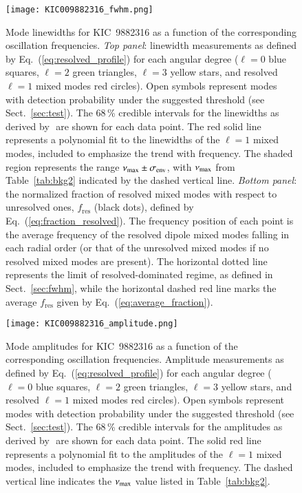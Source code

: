 \begin{figure}
   \centering
   \texttt{[image: KIC009882316\_fwhm.png]}
      \caption{Mode linewidths for KIC~9882316 as a function of the corresponding oscillation frequencies. \textit{Top panel}: linewidth measurements as defined by Eq.~(\ref{eq:resolved_profile}) for each angular degree ($\ell = 0$ blue squares, $\ell = 2$ green triangles, $\ell = 3$ yellow stars, and resolved $\ell = 1$ mixed modes red circles). Open symbols represent modes with detection probability under the suggested threshold (see Sect.~\ref{sec:test}). The 68\,\% credible intervals for the linewidths as derived by \diamonds\,\,are shown for each data point. The red solid line represents a polynomial fit to the linewidths of the $\ell = 1$ mixed modes, included to emphasize the trend with frequency. The shaded region represents the range $\nu_\mathrm{max} \pm \sigma_\mathrm{env}$, with $\nu_\mathrm{max}$ from Table~\ref{tab:bkg2} indicated by the dashed vertical line. \textit{Bottom panel}: the normalized fraction of resolved mixed modes with respect to unresolved ones, $f_\mathrm{res}$ (black dots), defined by Eq.~(\ref{eq:fraction_resolved}). The frequency position of each point is the average frequency of the resolved dipole mixed modes falling in each radial order (or that of the unresolved mixed modes if no resolved mixed modes are present). The horizontal dotted line represents the limit of resolved-dominated regime, as defined in Sect.~\ref{sec:fwhm}, while the horizontal dashed red line marks the average $f_\mathrm{res}$ given by Eq.~(\ref{eq:average_fraction}).}
    \label{fig:9882316fwhm}
\end{figure}


\begin{figure}
   \centering
   \texttt{[image: KIC009882316\_amplitude.png]}
      \caption{Mode amplitudes for KIC~9882316 as a function of the corresponding oscillation frequencies. Amplitude measurements as defined by Eq.~(\ref{eq:resolved_profile}) for each angular degree ($\ell = 0$ blue squares, $\ell = 2$ green triangles, $\ell = 3$ yellow stars, and resolved $\ell = 1$ mixed modes red circles). Open symbols represent modes with detection probability under the suggested threshold (see Sect.~\ref{sec:test}). The 68\,\% credible intervals for the amplitudes as derived by \diamonds\,\,are shown for each data point. The solid red line represents a polynomial fit to the amplitudes of the $\ell = 1$ mixed modes, included to emphasize the trend with frequency. The dashed vertical line indicates the $\nu_\mathrm{max}$ value listed in Table~\ref{tab:bkg2}.}
    \label{fig:9882316amplitude}
\end{figure}
\clearpage


